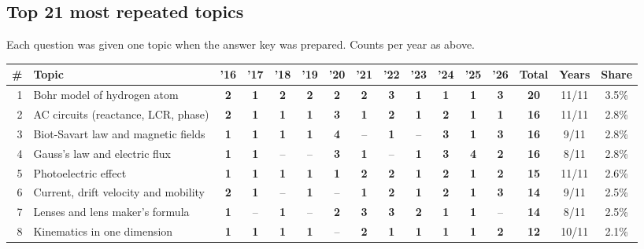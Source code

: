 \documentclass[10pt,a4paper]{article}
\begin{document}
\subsection*{Top 21 most repeated topics}
{\small Each question was given one topic when the answer key was prepared. Counts per year as above.}\par\smallskip
{\footnotesize\setlength{\tabcolsep}{2.6pt}\renewcommand{\arraystretch}{1.2}
\begin{tabularx}{\linewidth}{@{}r>{\raggedright\arraybackslash}X*{11}{c}ccc@{}}\toprule
\# & Topic & '16 & '17 & '18 & '19 & '20 & '21 & '22 & '23 & '24 & '25 & '26 & Total & Years & Share\\\midrule
1 & Bohr model of hydrogen atom & \textbf{2} & \textbf{1} & \textbf{2} & \textbf{2} & \textbf{2} & \textbf{2} & \textbf{3} & \textbf{1} & \textbf{1} & \textbf{1} & \textbf{3} & \textbf{20} & 11/11 & 3.5\%\\
2 & AC circuits (reactance, LCR, phase) & \textbf{2} & \textbf{1} & \textbf{1} & \textbf{1} & \textbf{3} & \textbf{1} & \textbf{2} & \textbf{1} & \textbf{2} & \textbf{1} & \textbf{1} & \textbf{16} & 11/11 & 2.8\%\\
3 & Biot-Savart law and magnetic fields & \textbf{1} & \textbf{1} & \textbf{1} & \textbf{1} & \textbf{4} & {\color{gray!60}--} & \textbf{1} & {\color{gray!60}--} & \textbf{3} & \textbf{1} & \textbf{3} & \textbf{16} & 9/11 & 2.8\%\\
4 & Gauss's law and electric flux & \textbf{1} & \textbf{1} & {\color{gray!60}--} & {\color{gray!60}--} & \textbf{3} & \textbf{1} & {\color{gray!60}--} & \textbf{1} & \textbf{3} & \textbf{4} & \textbf{2} & \textbf{16} & 8/11 & 2.8\%\\
5 & Photoelectric effect & \textbf{1} & \textbf{1} & \textbf{1} & \textbf{1} & \textbf{1} & \textbf{2} & \textbf{2} & \textbf{1} & \textbf{2} & \textbf{1} & \textbf{2} & \textbf{15} & 11/11 & 2.6\%\\
6 & Current, drift velocity and mobility & \textbf{2} & \textbf{1} & {\color{gray!60}--} & \textbf{1} & {\color{gray!60}--} & \textbf{1} & \textbf{2} & \textbf{1} & \textbf{2} & \textbf{1} & \textbf{3} & \textbf{14} & 9/11 & 2.5\%\\
7 & Lenses and lens maker's formula & \textbf{1} & {\color{gray!60}--} & \textbf{1} & {\color{gray!60}--} & \textbf{2} & \textbf{3} & \textbf{3} & \textbf{2} & \textbf{1} & \textbf{1} & {\color{gray!60}--} & \textbf{14} & 8/11 & 2.5\%\\
8 & Kinematics in one dimension & \textbf{1} & \textbf{1} & \textbf{1} & \textbf{1} & {\color{gray!60}--} & \textbf{2} & \textbf{1} & \textbf{1} & \textbf{1} & \textbf{1} & \textbf{2} & \textbf{12} & 10/11 & 2.1\%\\

\end{tabularx}}
\end{document}
